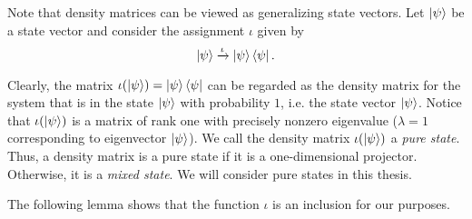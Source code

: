 \bigskip

Note that density matrices can be viewed as generalizing state vectors.  Let $\ket{\psi}$ be a state vector and consider the assignment $\iota$ given by
$$\ket{\psi} \xrightarrow{\iota} \ket{\psi}\bra{\psi}.$$

Clearly, the matrix $\iota(\ket{\psi})=\ket{\psi}\bra{\psi}$ can be regarded as the density matrix for the system that is in the state $\ket{\psi}$ with probability $1$, i.e. the state vector $\ket{\psi}$.  Notice that $\iota({\ket{\psi}})$ is a matrix of rank one with precisely nonzero eigenvalue ($\lambda=1$ corresponding to eigenvector $\ket{\psi}$).  We call the density matrix $\iota(\ket{\psi})$ a \textit{pure state}. Thus, a density matrix is a pure state if it is a one-dimensional projector. Otherwise, it is a \textit{mixed state}. We will consider pure states in this thesis.

The following lemma shows that the function $\iota$ is an inclusion for our purposes.


